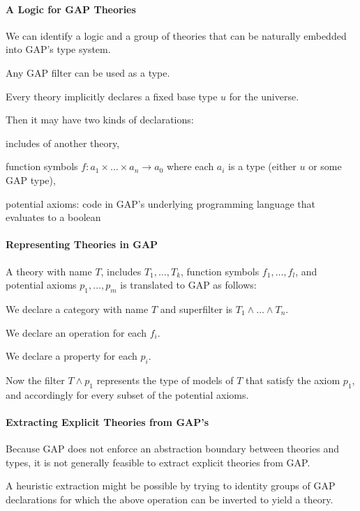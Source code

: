 
\paragraph{A Logic for GAP Theories}
We can identify a logic and a group of theories that can be naturally embedded into GAP's type system.

Any GAP filter can be used as a type.

Every theory implicitly declares a fixed base type $u$ for the universe.

Then it may have two kinds of declarations:
 \begin{compactitem}
   \item includes of another theory,
   \item function symbols $f:a_1\times\ldots\times a_n\to a_0$ where each $a_i$ is a type (either $u$ or some GAP type),
   \item potential axioms: code in GAP's underlying programming language that evaluates to a boolean
 \end{compactitem}

\paragraph{Representing Theories in GAP}
A theory with name $T$, includes $T_1,\ldots,T_k$, function symbols $f_1,\ldots,f_l$, and potential axioms $p_1,\ldots,p_m$ is translated to GAP as follows:
\begin{compactitem}
 \item We declare a category with name $T$ and superfilter is $T_1\wedge \ldots \wedge T_n$.
 \item We declare an operation for each $f_i$.
 \item We declare a property for each $p_i$.
\end{compactitem}

Now the filter $T\wedge p_1$ represents the type of models of $T$ that satisfy the axiom $p_1$, and accordingly for every subset of the potential axioms.

\paragraph{Extracting Explicit Theories from GAP's}
Because GAP does not enforce an abstraction boundary between theories and types, it is not generally feasible to extract explicit theories from GAP.

A heuristic extraction might be possible by trying to identity groups of GAP declarations for which the above operation can be inverted to yield a theory.